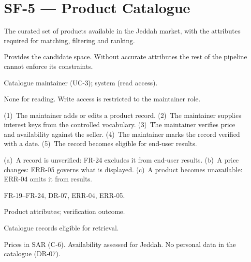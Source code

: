 \documentclass[11pt,a4paper]{report}
\begin{document}
\section{SF-5 --- Product Catalogue}
\begin{description}[style=nextline,leftmargin=0pt]
\item[Description] The curated set of products available in the Jeddah market, with the attributes required for matching, filtering and ranking.
\item[Purpose] Provides the candidate space. Without accurate attributes the rest of the pipeline cannot enforce its constraints.
\item[Actors] Catalogue maintainer (UC-3); system (read access).
\item[Preconditions] None for reading. Write access is restricted to the maintainer role.
\item[Main flow] (1)~The maintainer adds or edits a product record. (2)~The maintainer supplies interest keys from the controlled vocabulary. (3)~The maintainer verifies price and availability against the seller. (4)~The maintainer marks the record verified with a date. (5)~The record becomes eligible for end-user results.
\item[Alternative and exception flows] (a)~A record is unverified: FR-24 excludes it from end-user results. (b)~A price changes: ERR-05 governs what is displayed. (c)~A product becomes unavailable: ERR-04 omits it from results.
\item[Requirements] FR-19--FR-24, DR-07, ERR-04, ERR-05.
\item[Inputs] Product attributes; verification outcome.
\item[Outputs] Catalogue records eligible for retrieval.
\item[Constraints] Prices in SAR (C-6). Availability assessed for Jeddah. No personal data in the catalogue (DR-07).
\end{description}
\end{document}
